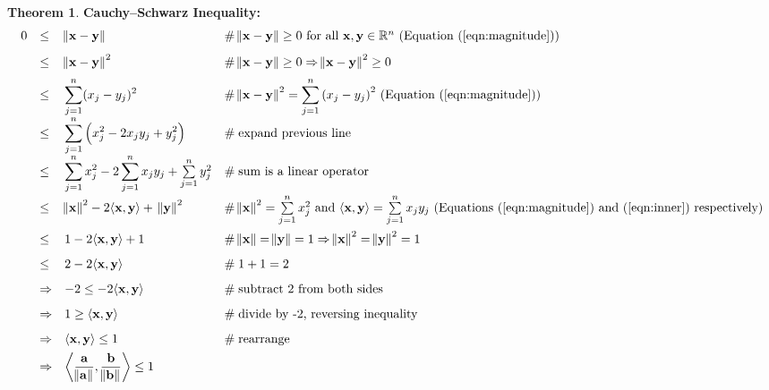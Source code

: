 \documentclass{article}
\theoremstyle{definition}
\newtheorem{theorem}{Theorem}[section]
\begin{document}
\begin{theorem} {\bf Cauchy–Schwarz Inequality:}
\medskip
\begin{equation*}
\begin{array}{lllll}
0
&\leq& \norm{\mathbf{x} - \mathbf{y}}
					&\mathrel{\#} \text{$\norm{\mathbf{x} - \mathbf{y}} \geq 0$ for all 
					$\mathbf{x}, \mathbf{y} \in \mathbb{R}^{n}$ (Equation (\ref{eqn:magnitude}))}\\
[8pt]
&\leq&  {\norm{\mathbf{x} - \mathbf{y}}}^2
					&\mathrel{\#} \norm{\mathbf{x} - \mathbf{y}} \geq 0 
					\Rightarrow  {\norm{\mathbf{x} - \mathbf{y}}}^2 \geq 0 \\ 
[6pt]
&\leq& {\displaystyle \sum\limits_{j = 1}^{n} (x_j - y_j)^2}
					&\mathrel{\#} \text{${\norm{\mathbf{x} - \mathbf{y}}}^2 = {\displaystyle 
					\sum\limits_{j = 1}^{n} {(x_j - y_j)}^2}$ (Equation (\ref{eqn:magnitude}))} \\
[8pt]
&\leq& {\displaystyle \sum\limits_{j = 1}^{n} \left ( x_{j}^2 - 2 x_{j} y_{j} + y_{j}^{2} \right )}
					&\mathrel{\#} \text{expand previous line} \\
[8pt]
&\leq& {\displaystyle \sum\limits_{j = 1}^{n} x_{j}^2 - 2 \sum\limits_{j = 1}^{n} x_{j} y_{j}} 
					+ \sum\limits_{j = 1}^{n} y_{j}^{2}
					&\mathrel{\#} \text{sum is a linear operator} \\
[12pt]
&\leq& {\norm{\mathbf{x}}}^2 - 2 \langle \mathbf{x},\mathbf{y} \rangle + \; {\norm{\mathbf{y}}}^2
					&\mathrel{\#} \text{${\norm{\mathbf{x}}}^2 = \sum\limits_{j = 1}^{n} x_{j}^2$  
					and $\langle \mathbf{x},\mathbf{y} \rangle  = \sum\limits_{j = 1}^{n} x_{j} y_{j}$ 
					(Equations  (\ref{eqn:magnitude}) and (\ref{eqn:inner}) respectively)} \\
[12pt]
&\leq& 1 - 2 \langle \mathbf{x},\mathbf{y} \rangle + 1
					&\mathrel{\#} \norm{\mathbf{x}} = \norm{\mathbf{y}} 
					= 1 \Rightarrow {\norm{\mathbf{x}}}^2 = {\norm{\mathbf{y}}}^2 = 1 \\
[8pt]
&\leq& 2- 2 \langle \mathbf{x},\mathbf{y} \rangle
					&\mathrel{\#} 1 + 1 = 2 \\
[8pt]
&\Rightarrow& -2 \leq -2 \langle \mathbf{x},\mathbf{y} \rangle
					&\mathrel{\#} \text{subtract 2 from both sides}  \\
[8pt]
&\Rightarrow& 1 \geq \langle \mathbf{x},\mathbf{y} \rangle 
					&\mathrel{\#} \text{divide by -2, reversing inequality}  \\
[8pt]
&\Rightarrow& \langle \mathbf{x},\mathbf{y} \rangle \leq 1
					&\mathrel{\#} \text{rearrange}  \\
[4pt]
&\Rightarrow& \left \langle \dfrac{\mathbf{a}}{\norm{\mathbf{a}}}, 
					{\dfrac{\mathbf{b}}{\norm{\mathbf{b}}}} \right\rangle \leq 1

\end{array}
\end{equation*}
\end{theorem}
\end{document}
